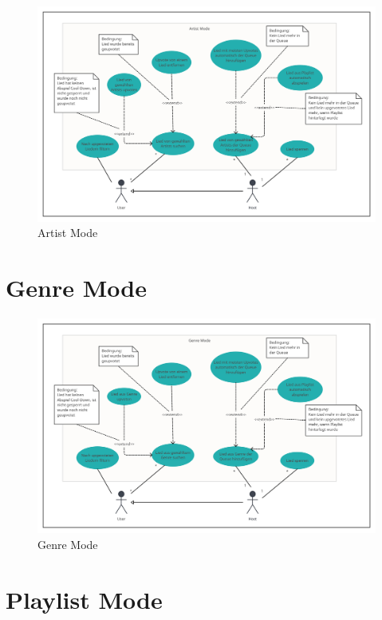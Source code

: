 \documentclass[oneside, ngerman]{sdqtechreport}
\begin{document}
\begin{figure}[h]
    \includegraphics[width = 18cm]{LATEX/Pflichtenheft/GraphicDesigns/Use Case Artist Mode.png}
    \caption{Artist Mode}
    \label{fig:Use Case Artist Mode}
\end{figure}

\newpage

\section{Genre Mode}
\label{sec:Anwendungsfälle:Genre Mode}

\begin{figure}[h]
    \includegraphics[width = 18cm]{LATEX/Pflichtenheft/GraphicDesigns/Use Case Genre Mode.png}
    \caption{Genre Mode}
    \label{fig:Use Case Genre Mode}
\end{figure}

\newpage

\section{Playlist Mode}
\label{sec:Anwendungsfälle:Playlist Mode}
\end{document}
